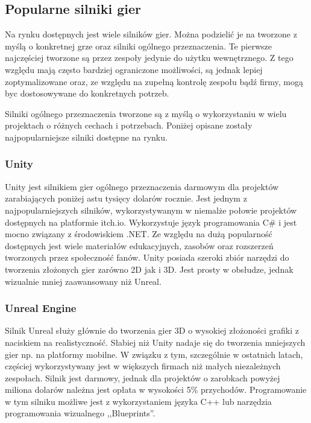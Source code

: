 \subsection{Popularne silniki gier}
Na rynku dostępnych jest wiele silników gier. Można podzielić je na tworzone z myślą o konkretnej grze oraz silniki ogólnego przeznaczenia\cite{game_engine_architecture}. Te pierwsze najczęściej tworzone są przez zespoły jedynie do użytku wewnętrznego. Z tego względu mają często bardziej ograniczone możliwości, są jednak lepiej zoptymalizowane oraz, ze względu na zupełną kontrolę zespołu bądź firmy, mogą byc dostosowywane do konkretnych potrzeb. 

Silniki ogólnego przeznaczenia tworzone są z myślą o wykorzystaniu w wielu projektach o różnych cechach i potrzebach. Poniżej opisane zostały najpopularniejsze silniki dostępne na rynku.
\subsubsection{Unity}
Unity jest silnikiem gier ogólnego przeznaczenia darmowym dla projektów zarabiających poniżej astu tysięcy dolarów rocznie\cite{unity_page}\cite{gamedev_unity}. Jest jednym z najpopularniejszych silników, wykorzystywanym w niemalże połowie projektów dostępnych na platformie itch.io\cite{most_used_engines}. Wykorzystuje język programowania C\# i jest mocno związany z środowiskiem .NET. Ze względu na dużą popularność dostępnych jest wiele materiałów edukacyjnych, zasobów oraz rozszerzeń tworzonych przez społeczność fanów. Unity posiada szeroki zbiór narzędzi do tworzenia złożonych gier zarówno 2D jak i 3D. Jest prosty w obsłudze, jednak wizualnie mniej zaawansowany niż Unreal.   

\subsubsection{Unreal Engine}
Silnik Unreal służy głównie do tworzenia gier 3D o wysokiej złożoności grafiki z naciskiem na realistyczność\cite{unreal_page}\cite{intro_to_ue4}. Słabiej niż Unity nadaje się do tworzenia mniejszych gier np. na platformy mobilne\cite{unity_v_unreal}. W związku z tym, szczególnie w ostatnich latach\cite{cdp_unreal}, częściej wykorzystywany jest w większych firmach niż małych niezależnych zespołach. Silnik jest darmowy, jednak dla projektów o zarobkach powyżej miliona dolarów należna jest opłata w wysokości 5\% przychodów. Programowanie w tym silniku możliwe jest z wykorzystaniem języka C++ lub narzędzia programowania wizualnego ,,Blueprints''. 

